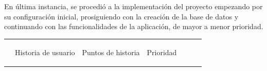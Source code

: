 \documentclass[pdftex,11pt,a4paper]{book}
\begin{document}
En última instancia, se procedió a la implementación del proyecto empezando por su configuración inicial, prosiguiendo con la creación de la base de datos y continuando con las funcionalidades de la aplicación, de mayor a menor prioridad.

\renewcommand{\tablename}{Tabla}

\renewcommand{\arraystretch}{1,7}

\begin{center}
\begin{longtable}{|>{\centering\arraybackslash}X m{}|m{}|>{\centering\arraybackslash}X m{}|>{\centering\arraybackslash}X m{}|}
\hline
{\centering Código} &
{\centering \begin{center}Historia de usuario\end{center}} &
{Puntos de historia} &
{Prioridad} &
\hline 
\endhead


\end{longtable}
\end{center}
\end{document}
